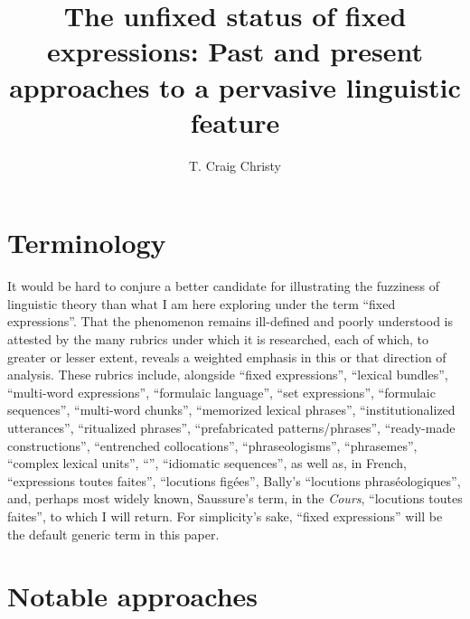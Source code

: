 \documentclass[english,output=paper,colorlinks,citecolor=brown]{../langscibook}
\author{T. Craig Christy\affiliation{University of North Alabama}\orcid{}}
\title{The unfixed status of fixed expressions: Past and present approaches to a pervasive linguistic feature}
\begin{document}
\maketitle

\section{Terminology}

It would be hard to conjure a better candidate for illustrating the fuzziness of linguistic theory than what I am here exploring under the term ``fixed expressions''. That the phenomenon remains ill-defined and poorly understood is attested by the many rubrics under which it is researched, each of which, to greater or lesser extent, reveals a weighted emphasis in this or that direction of analysis. These rubrics include, alongside ``fixed expressions'', ``lexical bundles'', ``multi-word expressions'', ``formulaic language'', ``set expressions'',
``formulaic sequences'',
``mul\-ti-word chunks'',
``memorized lexical phrases'',
``institutionalized utterances'',
``ritualized phrases'',
``prefabricated patterns/phrases'',
``ready-made constructions'',
``entrenched collocations'',
``phraseologisms'',
``phrasemes'',
``complex lexical units'',
``'',
``idiomatic sequences'',
as well as, in French, ``expressions toutes faites'', ``locutions figées'', Bally's ``locutions phraséologiques'', and, perhaps most widely known, Saussure's term, in the \textit{Cours}, ``locutions toutes faites'', to which I will return. For simplicity's sake, ``fixed expressions'' will be the default generic term in this paper.

\section{Notable approaches}
\end{document}
